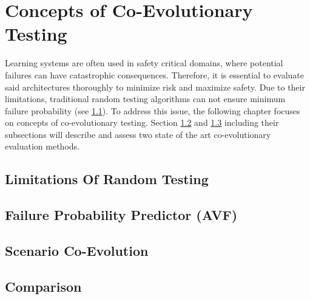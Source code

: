 \section{Concepts of Co-Evolutionary Testing}
\label{testing}
Learning systems are often used in safety critical domains, where potential failures can have catastrophic consequences. Therefore, it is essential to evaluate said architectures thoroughly to minimize risk and maximize safety. Due to their limitations, traditional random testing algorithms can not ensure minimum failure probability (see \ref{limitations}). To address this issue, the following chapter focuses on concepts of co-evolutionary testing. Section \ref{avf} and \ref{coevolution} including their subsections will describe and assess two state of the art co-evolutionary evaluation methods.


\subsection{Limitations Of Random Testing}
\label{limitations}



\subsection{Failure Probability Predictor (AVF)}
\label{avf}



\subsection{Scenario Co-Evolution}
\label{coevolution}


\subsection{Comparison}
\label{comparison}
